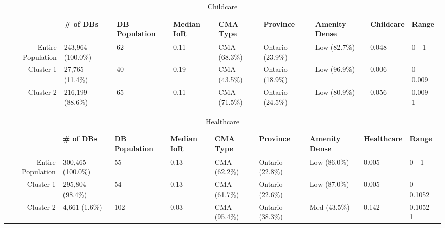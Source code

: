 \documentclass[10pt, a4paper]{article}
\begin{document}
\begin{sidewaystable}[ht]
\centering
\begin{tabular}{rllllllll}
  \hline
 & \# of DBs & DB Population & Median IoR & CMA Type & Province & Amenity Dense & Childcare & Range \\ 
  \hline
Entire Population & 243,964 (100.0\%) & 62 & 0.11 & CMA (68.3\%) & Ontario (23.9\%) & Low (82.7\%) & 0.048 & 0 - 1 \\ 
  Cluster 1 & 27,765 (11.4\%) & 40 & 0.19 & CMA (43.5\%) & Ontario (18.9\%) & Low (96.9\%) & 0.006 & 0 - 0.009 \\ 
  Cluster 2 & 216,199 (88.6\%) & 65 & 0.11 & CMA (71.5\%) & Ontario (24.5\%) & Low (80.9\%) & 0.056 & 0.009 - 1 \\ 
   \hline
\end{tabular}
\caption{Childcare} 
\end{sidewaystable}





 \pagebreak 
 
\begin{sidewaystable}[ht]
\centering
\begin{tabular}{rllllllll}
  \hline
 & \# of DBs & DB Population & Median IoR & CMA Type & Province & Amenity Dense & Healthcare & Range \\ 
  \hline
Entire Population & 300,465 (100.0\%) & 55 & 0.13 & CMA (62.2\%) & Ontario (22.8\%) & Low (86.0\%) & 0.005 & 0 - 1 \\ 
  Cluster 1 & 295,804 (98.4\%) & 54 & 0.13 & CMA (61.7\%) & Ontario (22.6\%) & Low (87.0\%) & 0.005 & 0 - 0.1052 \\ 
  Cluster 2 & 4,661 (1.6\%) & 102 & 0.03 & CMA (95.4\%) & Ontario (38.3\%) & Med (43.5\%) & 0.142 & 0.1052 - 1 \\ 
   \hline
\end{tabular}
\caption{Healthcare} 
\end{sidewaystable}





 \pagebreak 
 
\end{document}
